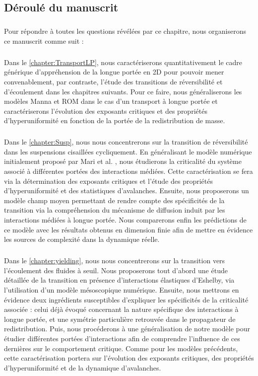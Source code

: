 \subsection{Déroulé du manuscrit}

\subparagraph{}Pour répondre à toutes les questions révélées par ce chapitre, nous organiserons ce manuscrit comme suit :

\subparagraph{}Dans le \autoref{chapter:TransportLP}, nous caractériserons quantitativement le cadre générique d'appréhension de la longue portée en 2D pour pouvoir mener convenablement, par contraste, l'étude des transitions de réversibilité et d'écoulement dans les chapitres suivants. Pour ce faire, nous généraliserons les modèles Manna et ROM dans le cas d'un transport à longue portée et caractériserons l'évolution des exposants critiques et des propriétés d'hyperuniformité en fonction de la portée de la redistribution de masse. 

\subparagraph{}Dans le \autoref{chapter:Susp}, nous nous concentrerons sur la transition de réversibilité dans les suspensions cisaillées cycliquement. En généralisant le modèle numérique initialement proposé par Mari et al. \cite{mari_absorbing_2022}, nous étudierons la criticalité du système associé à différentes portées des interactions médiées. Cette caractérisation se fera via la détermination des exposants critiques et l'étude des propriétés d'hyperuniformité et des statistiques d'avalanches. Ensuite, nous proposerons un modèle champ moyen permettant de rendre compte des spécificités de la transition via la compréhension du mécanisme de diffusion induit par les interactions médiées à longue portée. Nous comparerons enfin les prédictions de ce modèle avec les résultats obtenus en dimension finie afin de mettre en évidence les sources de complexité dans la dynamique réelle.

\subparagraph{}Dans le \autoref{chapter:yielding}, nous nous concentrerons sur la transition vers l'écoulement des fluides à seuil. Nous proposerons tout d'abord une étude détaillée de la transition en présence d'interactions élastiques d'Eshelby, via l'utilisation d'un modèle mésoscopique numérique. Ensuite, nous mettrons en évidence deux ingrédients susceptibles d'expliquer les spécificités de la criticalité associée : celui déjà évoqué concernant la nature spécifique des interactions à longue portée, et une symétrie particulière retrouvée dans le propagateur de redistribution. Puis, nous procéderons à une généralisation de notre modèle pour étudier différentes portées d'interactions afin de comprendre l'influence de ces dernières sur le comportement critique. Comme pour les modèles précédents, cette caractérisation portera sur l'évolution des exposants critiques, des propriétés d'hyperuniformité et de la dynamique d'avalanches.

